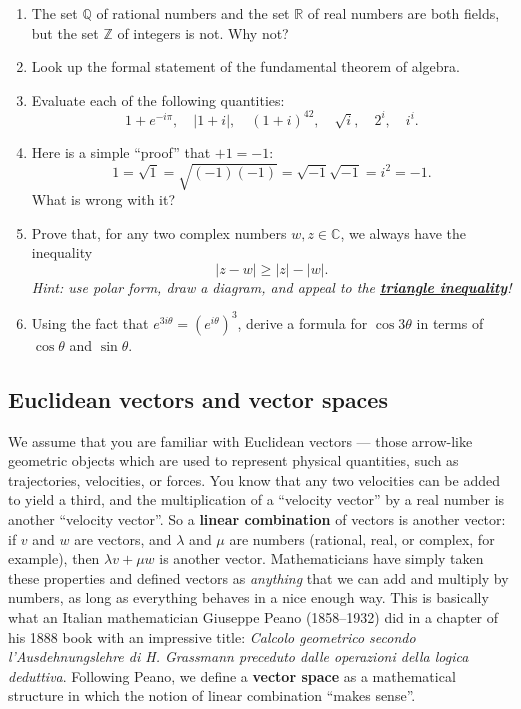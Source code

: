 \documentclass[fleqn]{article}
\providecommand{\tightlist}{%
  \setlength{\itemsep}{0pt}\setlength{\parskip}{0pt}}
\begin{document}
\begin{enumerate}
\def\labelenumi{\alph{enumi}.}
\tightlist
\item
  The set \(\mathbb{Q}\) of rational numbers and the set \(\mathbb{R}\) of real numbers are both fields, but the set \(\mathbb{Z}\) of integers is not. Why not?
\item
  Look up the formal statement of the fundamental theorem of algebra.
\item
  Evaluate each of the following quantities:
  \[
   1+e^{-i\pi},
   \quad
   |1+i|,
   \quad
   (1+i)^{42},
   \quad
   \sqrt{i},
   \quad
   2^i,
   \quad
   i^i.
    \]
\item
  Here is a simple ``proof'' that \(+1=-1\):
  \[
   1=\sqrt{1}=\sqrt{(-1)(-1)}=\sqrt{-1}\sqrt{-1}=i^2=-1.
    \]
  What is wrong with it?
\item
  Prove that, for any two complex numbers \(w,z\in\mathbb{C}\), we always have the inequality
  \[
   |z-w| \geqslant|z|-|w|.
    \]
  \emph{Hint: use polar form, draw a diagram, and appeal to the \href{https://en.wikipedia.org/wiki/Triangle_inequality}{\textbf{triangle inequality}}!}
\item
  Using the fact that \(e^{3i\theta}=(e^{i\theta})^3\), derive a formula for \(\cos3\theta\) in terms of \(\cos\theta\) and \(\sin\theta\).
\end{enumerate}

\hypertarget{euclidean-vectors-and-vector-spaces}{%
\subsection{Euclidean vectors and vector spaces}\label{euclidean-vectors-and-vector-spaces}}

We assume that you are familiar with Euclidean vectors --- those arrow-like geometric objects which are used to represent physical quantities, such as trajectories, velocities, or forces.
You know that any two velocities can be added to yield a third, and the multiplication of a ``velocity vector'' by a real number is another ``velocity vector''.
So a \textbf{linear combination} of vectors is another vector: if \(v\) and \(w\) are vectors, and \(\lambda\) and \(\mu\) are numbers (rational, real, or complex, for example), then \(\lambda v+\mu w\) is another vector.
Mathematicians have simply taken these properties and defined vectors as \emph{anything} that we can add and multiply by numbers, as long as everything behaves in a nice enough way.
This is basically what an Italian mathematician Giuseppe Peano (1858--1932) did in a chapter of his 1888 book with an impressive title: \emph{Calcolo geometrico secondo l'Ausdehnungslehre di H. Grassmann preceduto dalle operazioni della logica deduttiva}.
Following Peano, we define a \textbf{vector space} as a mathematical structure in which the notion of linear combination ``makes sense''.
\end{document}
